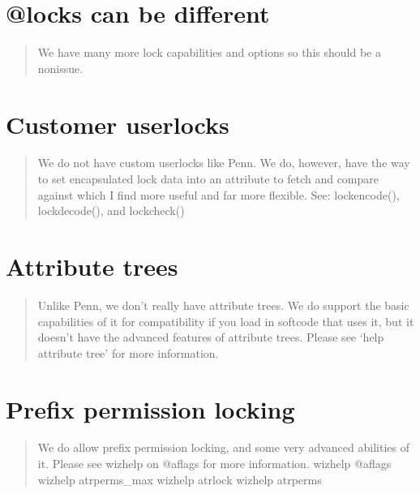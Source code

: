 \documentclass[letterpaper,10pt,english]{sphinxmanual}
\begin{document}
\section{@locks can be different}
\label{\detokenize{10-customize:locks-can-be-different}}\begin{quote}

\sphinxAtStartPar
We have many more lock capabilities and options
so this should be a non\sphinxhyphen{}issue.
\end{quote}


\section{Customer user\sphinxhyphen{}locks}
\label{\detokenize{10-customize:customer-user-locks}}\begin{quote}

\sphinxAtStartPar
We do not have custom user\sphinxhyphen{}locks like Penn.  We do, however, have the way
to set encapsulated lock data into an attribute to fetch and compare
against which I find more useful and far more flexible.
See: lockencode(), lockdecode(), and lockcheck()
\end{quote}


\section{Attribute trees}
\label{\detokenize{10-customize:attribute-trees}}\begin{quote}

\sphinxAtStartPar
Unlike Penn, we don’t really have attribute trees.  We do support the
basic capabilities of it for compatibility if you load in softcode that
uses it, but it doesn’t have the advanced features of attribute trees.
Please see ‘help attribute tree’ for more information.
\end{quote}


\section{Prefix permission locking}
\label{\detokenize{10-customize:prefix-permission-locking}}\begin{quote}

\sphinxAtStartPar
We do allow prefix permission locking, and some very advanced abilities
of it.  Please see wizhelp on @aflags for more information.
\sphinxhyphen{} wizhelp @aflags
\sphinxhyphen{} wizhelp atrperms\_max
\sphinxhyphen{} wizhelp atrlock
\sphinxhyphen{} wizhelp atrperms
\end{quote}
\end{document}
